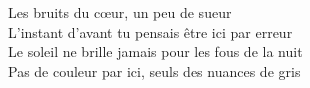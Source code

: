 Les bruits du cœur, un peu de sueur \\
L'instant d'avant tu pensais être ici par erreur \\
Le soleil ne brille jamais pour les fous de la nuit \\
Pas de couleur par ici, seuls des nuances de gris
